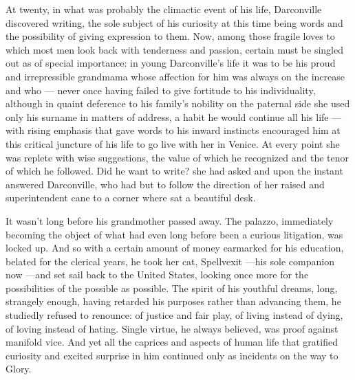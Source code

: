   At twenty, in what was probably the climactic event of his life, Darconville
discovered writing, the sole subject of his curiosity at this time being words
and the possibility of giving expression to them. Now, among those fragile loves
to which most men look back with tenderness and passion, certain must be singled
out as of special importance: in young Darconville's life it was to be his proud
and irrepressible grandmama whose affection for him was always on the increase
and who --- never once having failed to give fortitude to his individuality,
although in quaint 
deference 
to his family's nobility on the paternal side she
used only his surname in matters of address, a habit he would continue all his
life --- with rising emphasis that gave words to his inward instincts encouraged him
at this critical juncture of his life to go live with her in Venice. At every
point she was replete 
with wise suggestions, the value of which he recognized and the tenor 
of which he followed. Did he want to write? she had asked and upon
the instant answered Darconville, who had but to follow the direction of her
raised and superintendent cane to a corner where sat a beautiful desk.

  It wasn't long before his grandmother passed away. The palazzo, immediately
becoming the object of what had even long before been a curious litigation, 
was locked up. And so with a certain amount of money earmarked 
for his education, belated 
for the clerical years, he took her cat, Spellvexit ---his sole companion
now ---and set sail back to the United States, looking once more for the
possibilities of the possible as possible. The spirit of his youthful dreams,
long, strangely enough, having retarded his purposes rather than advancing them,
he studiedly 
refused to renounce: of justice and fair play, of living instead of
dying, of loving instead of hating. Single virtue, he always believed, was proof
against manifold vice. And yet all the caprices 
and aspects of human life that
gratified curiosity and excited surprise in him continued only as incidents on
the way to Glory.

